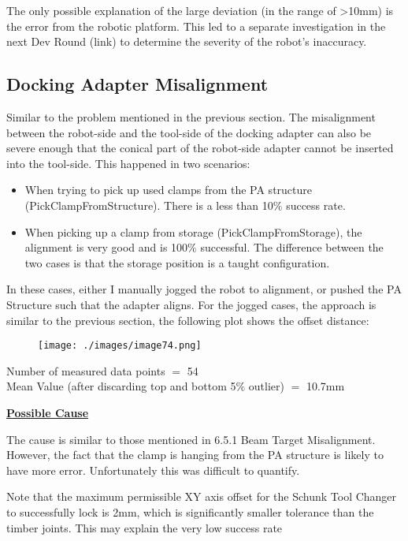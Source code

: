 The only possible explanation of the large deviation (in the range of >10mm) is the error from the robotic platform. This led to a separate investigation in the next Dev Round (link) to determine the severity of the robot’s inaccuracy.

\subsection{Docking Adapter Misalignment}

Similar to the problem mentioned in the previous section. The misalignment between the robot-side and the tool-side of the docking adapter can also be severe enough that the conical part of the robot-side adapter cannot be inserted into the tool-side. This happened in two scenarios:

\begin{itemize}
	\item When trying to pick up used clamps from the PA structure (PickClampFromStructure). There is a less than 10$\%$ success rate.

	\item When picking up a clamp from storage (PickClampFromStorage), the alignment is very good and is 100$\%$ successful. The difference between the two cases is that the storage position is a taught configuration.

\end{itemize}
In these cases, either I manually jogged the robot to alignment, or pushed the PA Structure such that the adapter aligns. For the jogged cases, the approach is similar to the previous section, the following plot shows the offset distance:

{\footnotesize \begin{figure}[H]
\texttt{[image: ./images/image74.png]}
\end{figure}
}

{\footnotesize Number of measured data points $=$ 54 \\ Mean Value (after discarding top and bottom 5$\%$ outlier) $=$ 10.7mm}

\textbf{\uline{Possible Cause}}

The cause is similar to those mentioned in 6.5.1 Beam Target Misalignment. However, the fact that the clamp is hanging from the PA structure is likely to have more error. Unfortunately this was difficult to quantify. 

Note that the maximum permissible XY axis offset for the Schunk Tool Changer to successfully lock is 2mm, which is significantly smaller tolerance than the timber joints. This may explain the very low success rate

